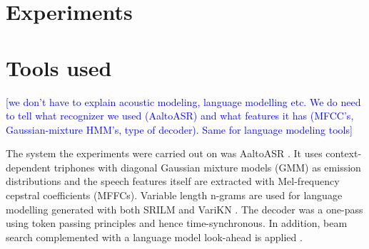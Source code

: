 \documentclass[b5paper]{article}
\newcommand{\note}[1]{{\textcolor{blue}{[#1]}}}
\begin{document}
\section{Experiments}

\section{Tools used}

\note{we don't have to explain acoustic modeling, language modelling etc. We do need to tell what recognizer we used (AaltoASR) and what features it has (MFCC's, Gaussian-mixture HMM's, type of decoder). Same for language modeling tools}


The system the experiments were carried out on was AaltoASR \cite{hirsimaki2009importance}\cite{pylkkonen2005efficient}. It uses context-dependent triphones with diagonal Gaussian mixture models (GMM) as emission distributions and the speech features itself are extracted with Mel-frequency cepstral coefficients (MFFCs). Variable length n-grams are used for language modelling generated with both SRILM and VariKN \cite{siivola2007growing}\cite{siivola2007morfessor}. The decoder was a one-pass using token passing principles and hence time-synchronous. In addition, beam search complemented with a language model look-ahead is applied \cite{ortmanns1997look}.
\end{document}
